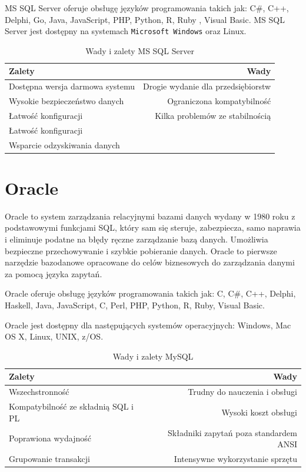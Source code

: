 \documentclass[oneside,polski,logo,indent]{amuthesis}
\begin{document}
\begin{enumerate}
\begin{enumerate}
MS SQL Server oferuje obsługę języków programowania takich jak: C\#, C++, Delphi, Go, Java, JavaScript, PHP, Python, R, Ruby , Visual Basic.
MS SQL Server jest dostępny na systemach \texttt{Microsoft Windows} oraz Linux.

\begin{table}[H]
\caption{Wady i zalety MS SQL Server}
\label{tabela-MS SQL Server}
\centering
\begin{adjustbox}{width=1\textwidth}
\small
\begin{tabular}{lr}
\toprule
Zalety & Wady\\
\midrule
Dostępna wersja darmowa systemu & Drogie wydanie dla przedsiębiorstw\\
Wysokie bezpieczeństwo danych & Ograniczona kompatybilność\\
Łatwość konfiguracji & Kilka problemów ze stabilnością\\
Łatwość konfiguracji & \\
Wsparcie odzyskiwania danych & \\
\bottomrule
\end{tabular}
\end{adjustbox}
\end{table}
\section{Oracle}
Oracle to system zarządzania relacyjnymi bazami danych wydany w 1980 roku z podstawowymi funkcjami SQL, który sam się steruje, zabezpiecza, samo naprawia i eliminuje podatne na błędy ręczne zarządzanie bazą danych. Umożliwia bezpieczne przechowywanie i szybkie pobieranie danych. Oracle to pierwsze narzędzie bazodanowe opracowane do celów biznesowych do zarządzania danymi za pomocą języka zapytań. 

Oracle oferuje obsługę języków programowania takich jak: C, C\#, C++, Delphi, Haskell, Java, JavaScript, C, Perl, PHP, Python, R, Ruby, Visual Basic.

Oracle jest dostępny dla następujących systemów operacyjnych: Windows, Mac OS X, Linux, UNIX, z/OS.
\begin{table}[H]
\caption{Wady i zalety MySQL}
\label{tabela-Oracle}
\centering
\begin{adjustbox}{width=1\textwidth}
\small
\begin{tabular}{lr}
\toprule
Zalety & Wady\\
\midrule
Wszechstronność & Trudny do nauczenia i obsługi\\
Kompatybilność ze składnią SQL i PL & Wysoki koszt obsługi\\
Poprawiona wydajność & Składniki zapytań poza standardem ANSI \\
Grupowanie transakcji & Intensywne wykorzystanie sprzętu\\
\bottomrule
\end{tabular}
\end{adjustbox}
\end{table}

\end{enumerate}
\end{enumerate}
\end{document}
